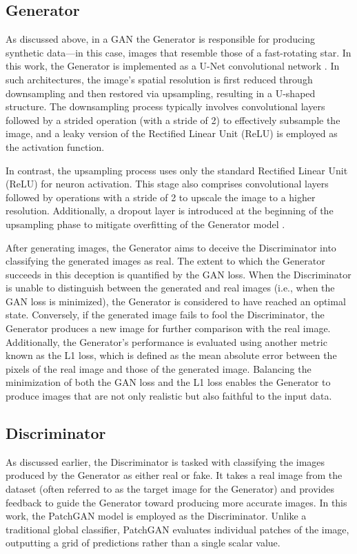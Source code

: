 \subsection{Generator}
As discussed above, in a GAN the Generator is responsible for producing synthetic data—in this case, images that resemble those of a fast-rotating star. In this work, the Generator is implemented as a U-Net convolutional network \citep{ronneberger2015u}. In such architectures, the image's spatial resolution is first reduced through downsampling and then restored via upsampling, resulting in a U-shaped structure. The downsampling process typically involves convolutional layers followed by a strided operation (with a stride of 2) to effectively subsample the image, and a leaky version of the Rectified Linear Unit (ReLU) is employed as the activation function.

In contrast, the upsampling process uses only the standard Rectified Linear Unit (ReLU) for neuron activation. This stage also comprises convolutional layers followed by operations with a stride of 2 to upscale the image to a higher resolution. Additionally, a dropout layer is introduced at the beginning of the upsampling phase to mitigate overfitting of the Generator model \citep{isola2017image}.

After generating images, the Generator aims to deceive the Discriminator into classifying the generated images as real. The extent to which the Generator succeeds in this deception is quantified by the GAN loss. When the Discriminator is unable to distinguish between the generated and real images (i.e., when the GAN loss is minimized), the Generator is considered to have reached an optimal state. Conversely, if the generated image fails to fool the Discriminator, the Generator produces a new image for further comparison with the real image. Additionally, the Generator's performance is evaluated using another metric known as the L1 loss, which is defined as the mean absolute error between the pixels of the real image and those of the generated image. Balancing the minimization of both the GAN loss and the L1 loss enables the Generator to produce images that are not only realistic but also faithful to the input data. 

\subsection{Discriminator}
As discussed earlier, the Discriminator is tasked with classifying the images produced by the Generator as either real or fake. It takes a real image from the dataset (often referred to as the target image for the Generator) and provides feedback to guide the Generator toward producing more accurate images. In this work, the PatchGAN model \citep{isola2017image} is employed as the Discriminator. Unlike a traditional global classifier, PatchGAN evaluates individual patches of the image, outputting a grid of predictions rather than a single scalar value.

